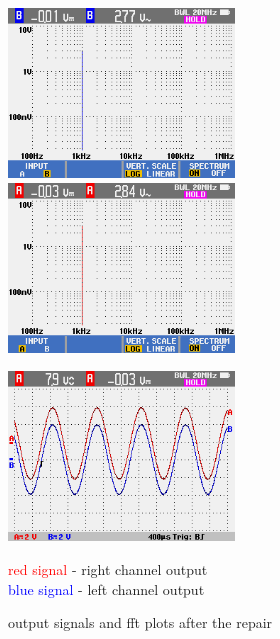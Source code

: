 \documentclass[a4paper,twoside,notitlepage]{article}
\begin{document}
\begin{figure}[hptb!]
 \centering
 \includegraphics[width=6cm, keepaspectratio=true]{img_report/output_L_fft.png}
 \includegraphics[width=6cm, keepaspectratio=true]{img_report/output_R_fft.png}

 \vspace*{5mm}
 \includegraphics[width=6cm, keepaspectratio=true]{img_report/outputs_repaired.png}

 \textcolor{Red}{red signal} - right channel output \\
 \textcolor{Blue}{blue signal} - left channel output \\

 \caption{output signals and fft plots after the repair}
\end{figure}
\end{document}
